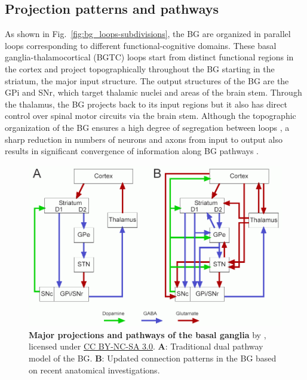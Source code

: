 \subsection{Projection patterns and pathways}
%
%
%
%
%
As shown in Fig.~\ref{fig:bg_loops-subdivisions}, the BG are organized in parallel
loops corresponding to different functional-cognitive domains. These
basal ganglia-thalamocortical (BGTC) loops start from distinct functional regions
in the cortex and project topographically throughout the BG starting in the striatum,
the major input structure. The output structures of the BG are the GPi and SNr, which
target thalamic nuclei and areas of the brain stem. Through the thalamus, the BG projects
back to its input regions but it also has direct control over spinal motor circuits
via the brain stem. Although the topographic organization of the BG ensures a high degree of
segregation between loops \cite{alexander_parallel_1986}, a sharp reduction in numbers
of neurons and axons from input to output also results in significant convergence
of information along BG pathways \cite{kandel_principles_2013}.
%
%

%
\begin{figure}[h]
\centering
\includegraphics[width=\textwidth]{ch_background_literature/figs/Redgrave2007_BG_diagram_Scholarpedia.png}
\caption{
\textbf{Major projections and pathways of the basal ganglia} by \cite{redgrave_basal_2007}, licensed under \href{https://creativecommons.org/licenses/by-nc-sa/3.0/deed.en_US}{CC BY-NC-SA 3.0}.
\textbf{A}: Traditional dual pathway model of the BG.
\textbf{B}: Updated connection patterns in the BG based on recent anatomical investigations.
}
%
\label{fig:bg_pathways-projections}
\end{figure}

